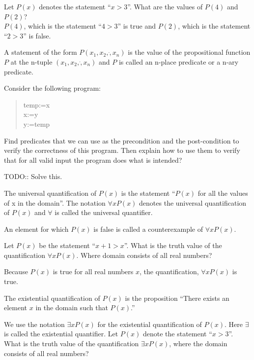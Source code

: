 \documentclass[../main-sheet.tex]{subfiles}
\begin{document}
\begin{ex}
    Let \(P(x)\) denotes the statement ``\(x>3\)''. What are the values of \(P(4)\) and \(P(2)\)?\\
    \(P(4)\), which is the statement ``\(4>3\)'' is true and \(P(2)\), which is the statement ``\(2>3\)'' is false.
\end{ex}
A statement of the form \(P(x_1,x_2,\dot,x_n)\) is the value of the propositional function $ P $ at the n-tuple \((x_1,x_2,\dot,x_n)\) and $ P $ is called an n-place predicate or a n-ary predicate.
\begin{prob}
    Consider the following program:
    \begin{quote}
        temp:=x\\x:=y\\y:=temp
    \end{quote}
    Find predicates that we can use as the precondition and the post-condition to verify the correctness of this program.
    Then explain how to use them to verify that for all valid input the program does what is intended?
\end{prob}
TODO:: Solve this.
\begin{defn}[Quantifiers]
    The universal quantification of \(P(x)\) is the statement ``\(P(x)\) for all the values of x in the domain''.
    The notation \(\forall x P(x)\) denotes the universal quantification of \(P(x)\) and \(\forall\) is called the universal quantifier.

    An element for which \(P(x)\) is false is called a counterexample of \(\forall x P(x)\).
\end{defn}
\begin{ex}
    Let \(P(x)\) be the statement ``\(x+1>x\)''. What is the truth value of the quantification \(\forall x P(x)\). Where domain consists of all real numbers?

    Because \(P(x)\) is true for all real numbers \(x\), the quantification, \(\forall x P(x)\) is true.
\end{ex}
\begin{defn}
    The existential quantification of \(P(x)\) is the proposition ``There exists an element $ x $ in the domain such that \(P(x)\).''

    We use the notation \(\exists xP(x)\) for the existential quantification of \(P(x)\). Here \(\exists\) is called the existential quantifier.
    Let \(P(x)\) denote the statement ``\(x>3\)''. What is the truth value of the quantification \(\exists xP(x)\), where the domain consists of all real numbers?
\end{defn}
\end{document}
